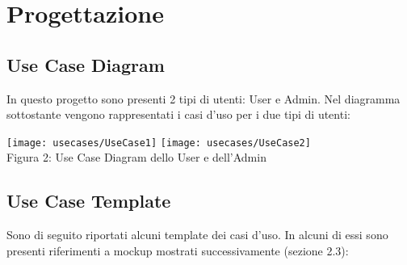 \documentclass[10pt]{article}
\begin{document}
\section{Progettazione}
\subsection{Use Case Diagram}

In questo progetto sono presenti 2 tipi di utenti: User e Admin. Nel diagramma sottostante vengono rappresentati i casi d'uso per i due tipi di utenti: 

\begin{center}
\texttt{[image: usecases/UseCase1]}
\texttt{[image: usecases/UseCase2]}\\
Figura 2: Use Case Diagram dello User e dell'Admin
\end{center}

\subsection{Use Case Template}
Sono di seguito riportati alcuni template dei casi d'uso. In alcuni di essi sono presenti riferimenti a mockup mostrati successivamente (sezione 2.3):
\end{document}
